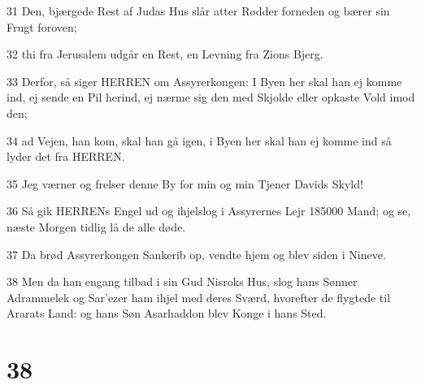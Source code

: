 \par 31 Den, bjærgede Rest af Judas Hus slår atter Rødder forneden og bærer sin Frugt foroven;
\par 32 thi fra Jerusalem udgår en Rest, en Levning fra Zions Bjerg.
\par 33 Derfor, så siger HERREN om Assyrerkongen: I Byen her skal han ej komme ind, ej sende en Pil herind, ej nærme sig den med Skjolde eller opkaste Vold imod den;
\par 34 ad Vejen, han kom, skal han gå igen, i Byen her skal han ej komme ind så lyder det fra HERREN.
\par 35 Jeg værner og frelser denne By for min og min Tjener Davids Skyld!
\par 36 Så gik HERRENs Engel ud og ihjelslog i Assyrernes Lejr 185000 Mand; og se, næste Morgen tidlig lå de alle døde.
\par 37 Da brød Assyrerkongen Sankerib op, vendte hjem og blev siden i Nineve.
\par 38 Men da han engang tilbad i sin Gud Nisroks Hus, slog hans Sønner Adrammelek og Sar'ezer ham ihjel med deres Sværd, hvorefter de flygtede til Ararats Land: og hans Søn Asarhaddon blev Konge i hans Sted.

\chapter{38}

